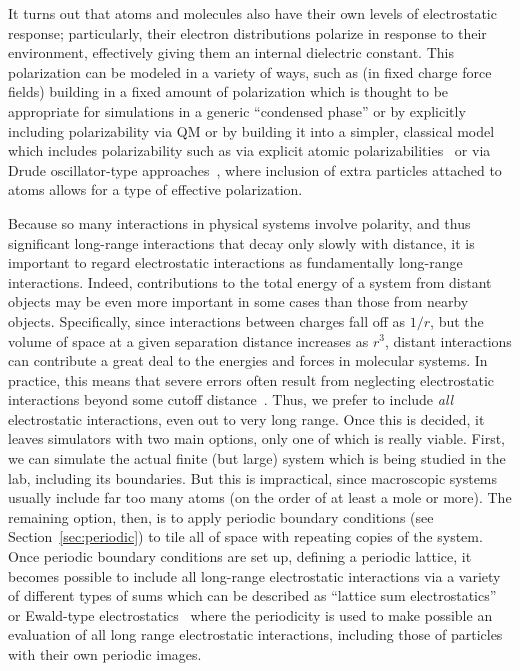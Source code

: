 \documentclass[9pt,bestpractices]{livecoms}
\begin{document}
It turns out that atoms and molecules also have their own levels of electrostatic response; particularly, their electron distributions polarize in response to their environment, effectively giving them an internal dielectric constant. 
This polarization can be modeled in a variety of ways, such as (in fixed charge force fields) building in a fixed amount of polarization which is thought to be appropriate for simulations in a generic ``condensed phase'' or by explicitly including polarizability via QM or by building it into a simpler, classical model which includes polarizability such as via explicit atomic polarizabilities~\cite{Ponder2003, Ponder:2010:JPhysChemB} or via Drude oscillator-type approaches~\cite{Lemkul:2016:ChemRev}, where inclusion of extra particles attached to atoms allows for a type of effective polarization.

Because so many interactions in physical systems involve polarity, and thus significant long-range interactions that decay only slowly with distance, it is important to regard electrostatic interactions as fundamentally long-range interactions.
Indeed, contributions to the total energy of a system from distant objects may be even more important in some cases than those from nearby objects.
Specifically, since interactions between charges fall off as $1/r$, but the volume of space at a given separation distance increases as $r^3$, distant interactions can contribute a great deal to the energies and forces in molecular systems.
In practice, this means that severe errors often result from neglecting electrostatic interactions beyond some cutoff distance~\cite{LeachBook, York:1993:JChemPhys, Darden:1993:JChemPhys, Piana:2012:PLOSONE, Sagui:1999:AnnuRevBiophysBiomolStruct}. 
Thus, we prefer to include \emph{all} electrostatic interactions, even out to very long range. 
Once this is decided, it  leaves simulators with two main options, only one of which is really viable.
First, we can simulate the actual finite (but large) system which is being studied in the lab, including its boundaries.
But this is impractical, since macroscopic systems usually include far too many atoms (on the order of at least a mole or more).
The remaining option, then, is to apply periodic boundary conditions (see Section~\ref{sec:periodic}) to tile all of space with repeating copies of the system. 
Once periodic boundary conditions are set up, defining a periodic lattice, it becomes possible to include all long-range electrostatic interactions via a variety of different types of sums which can be described as ``lattice sum electrostatics'' or Ewald-type electrostatics~\cite{Sagui:1999:AnnuRevBiophysBiomolStruct, Cisneros:2014:ChemRev} where the periodicity is used to make possible an evaluation of all long range electrostatic interactions, including those of particles with their own periodic images.
\end{document}
